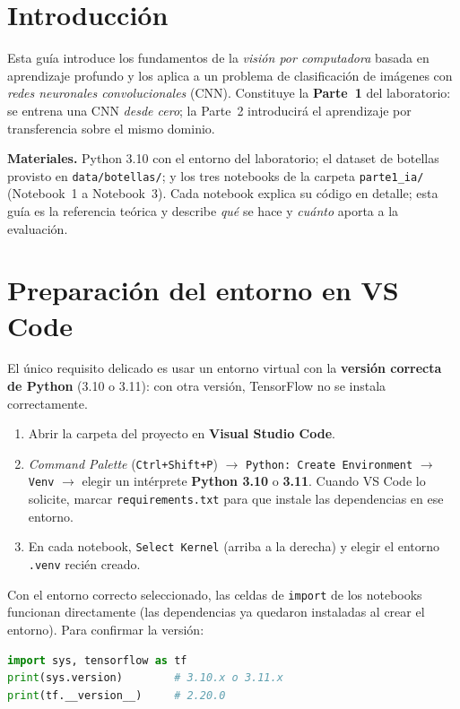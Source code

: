 \section{Introducción}

Esta guía introduce los fundamentos de la \emph{visión por computadora} basada en
aprendizaje profundo y los aplica a un problema de clasificación de imágenes con
\emph{redes neuronales convolucionales} (CNN). Constituye la \textbf{Parte~1} del
laboratorio: se entrena una CNN \emph{desde cero}; la Parte~2 introducirá el
aprendizaje por transferencia sobre el mismo dominio.

\textbf{Materiales.} Python 3.10 con el entorno del laboratorio; el dataset de
botellas provisto en \texttt{data/botellas/}; y los tres notebooks de la carpeta
\texttt{parte1\_ia/} (Notebook~1 a Notebook~3). Cada notebook explica su código en
detalle; esta guía es la referencia teórica y describe \emph{qué} se hace y
\emph{cuánto} aporta a la evaluación.

\section{Preparación del entorno en VS Code}

El único requisito delicado es usar un entorno virtual con la \textbf{versión correcta de
Python} (3.10 o 3.11): con otra versión, TensorFlow no se instala correctamente.

\begin{enumerate}
  \item Abrir la carpeta del proyecto en \textbf{Visual Studio Code}.
  \item \emph{Command Palette} (\texttt{Ctrl+Shift+P}) $\rightarrow$
        \texttt{Python: Create Environment} $\rightarrow$ \texttt{Venv} $\rightarrow$ elegir
        un intérprete \textbf{Python 3.10} o \textbf{3.11}. Cuando VS Code lo solicite,
        marcar \texttt{requirements.txt} para que instale las dependencias en ese entorno.
  \item En cada notebook, \texttt{Select Kernel} (arriba a la derecha) y elegir el entorno
        \texttt{.venv} recién creado.
\end{enumerate}

Con el entorno correcto seleccionado, las celdas de \texttt{import} de los notebooks
funcionan directamente (las dependencias ya quedaron instaladas al crear el entorno). Para
confirmar la versión:

\begin{lstlisting}[language=Python]
import sys, tensorflow as tf
print(sys.version)        # 3.10.x o 3.11.x
print(tf.__version__)     # 2.20.0
\end{lstlisting}


